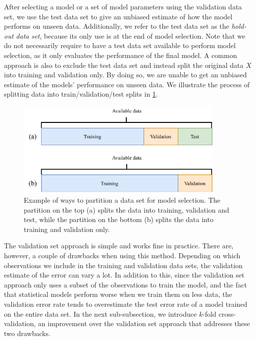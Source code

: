 After selecting a model or a set of model parameters using the validation data set, we use the test data set to give an unbiased estimate of how the model performs on unseen data. Additionally, we refer to the test data set as the \textit{hold-out data set}, because its only use is at the end of model selection. Note that we do not necessarily require to have a test data set available to perform model selection, as it only evaluates the performance of the final model. A common approach is also to exclude the test data set and instead split the original data $X$ into training and validation only. By doing so, we are unable to get an unbiased estimate of the models' performance on unseen data. We illustrate the process of splitting data into train/validation/test splits in \cref{fig:train-val-test-splits}.
\begin{figure}[H]
    \centering
    \includegraphics[width=0.9\textwidth]{thesis/figures/train-val-test-splits_cropped.pdf}
    \caption{Example of ways to partition a data set for model selection. The partition on the top (a) splits the data into training, validation and test, while the partition on the bottom (b) splits the data into training and validation only.}
    \label{fig:train-val-test-splits}
\end{figure}

The validation set approach is simple and works fine in practice. There are, however, a couple of drawbacks when using this method. Depending on which observations we include in the training and validation data sets, the validation estimate of the error can vary a lot. In addition to this, since the validation set approach only uses a subset of the observations to train the model, and the fact that statistical models perform worse when we train them on less data, the validation error rate tends to overestimate the test error rate of a model trained on the entire data set. In the next sub-subsection, we introduce $k$-fold cross-validation, an improvement over the validation set approach that addresses these two drawbacks.

